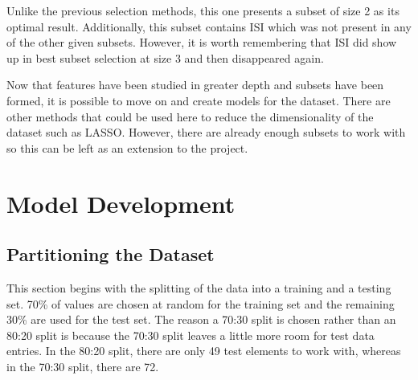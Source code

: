 \documentclass[
]{article}
\begin{document}
Unlike the previous selection methods, this one presents a subset of
size 2 as its optimal result. Additionally, this subset contains ISI
which was not present in any of the other given subsets. However, it is
worth remembering that ISI did show up in best subset selection at size
3 and then disappeared again.

Now that features have been studied in greater depth and subsets have
been formed, it is possible to move on and create models for the
dataset. There are other methods that could be used here to reduce the
dimensionality of the dataset such as LASSO. However, there are already
enough subsets to work with so this can be left as an extension to the
project.

\section{Model Development}\label{model-development}

\subsection{Partitioning the Dataset}\label{partitioning-the-dataset}

This section begins with the splitting of the data into a training and a
testing set. 70\% of values are chosen at random for the training set
and the remaining 30\% are used for the test set. The reason a 70:30
split is chosen rather than an 80:20 split is because the 70:30 split
leaves a little more room for test data entries. In the 80:20 split,
there are only 49 test elements to work with, whereas in the 70:30
split, there are 72.
\end{document}

